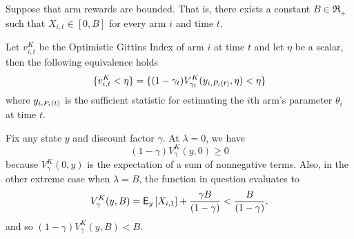 \begin{lemma} \label{cor:equivalent_event}
	Suppose that arm rewards are bounded. That is, there exists a constant $B \in \Re_+$ such that $X_{i,t} \in [0, B]$ for every arm $i$ and time $t$. 
	
	Let $v^K_{i,t}$ be the Optimistic Gittins Index of arm $i$ at time $t$ and let $\eta$ be a scalar, then the following equivalence holds
	\[
	\{v^K_{i,t} < \eta \} = \{(1-\gamma_t)V^K_{\gamma_t}(y_{i,P_{i}(t)}, \eta) < \eta\}\]
	where {\color{blue}$y_{i,P_{i}(t)}$} is the sufficient statistic for estimating the $i$th arm's parameter $\theta_i$ at time $t$.
\end{lemma}
{
\color{blue}
\begin{myproof}[Proof.]
	Fix any state $y$ and discount factor $\gamma$. At $\lambda = 0$, we have
	\[
		(1-\gamma)V^K_{\gamma}(y, 0) \ge 0
	\]
	because $V^K_{\gamma}(0,y)$ is the expectation of a sum of nonnegative terms. Also, in the other extreme case when $\lambda = B$, the function in question evaluates to
	\[
		V^K_{\gamma}(y, B) = \mathsf{E}_y\left[X_{i,1}\right] + \frac{\gamma B}{(1-\gamma)} < \frac{B}{(1-\gamma)}.
	\]
	and so $(1-\gamma)V^{K}_\gamma(y, B) < B$.
	

\end{myproof}}
